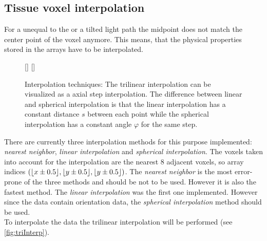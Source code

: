 \subsection{Tissue voxel interpolation}
% 
For a \stepsize{} unequal to the \voxelsize{} or a tilted light path the midpoint does not match the center point of the voxel anymore.
This means, that the physical properties stored in the arrays have to be interpolated.
% 
\begin{figure}[!t]
\centering
\setlength{\tikzwidth}{0.45\textwidth}
[\tikzwidth]{
\hfill{}\hfill}\hfill
{}[\tikzwidth]{
}
\caption[]{Interpolation techniques: The trilinear interpolation can be visualized as a axial step interpolation. The difference between linear and spherical interpolation is that the linear interpolation has a constant distance $s$ between each point while the spherical interpolation has a constant angle $\varphi$ for the same step.}
\label{fig:vectorfield_disc}
\end{figure}
% 
There are currently three interpolation methods for this purpose implemented: \textit{nearest neighbor}, \textit{linear interpolation} and \textit{spherical interpolation}. 
The voxels taken into account for the interpolation are the nearest 8 adjacent voxels, so array indices $(\lfloor x\pm0.5\rfloor,\lfloor y\pm0.5\rfloor,\lfloor y\pm0.5\rfloor)$.
% 
The \textit{nearest neighbor} is the most error-prone of the three methods and should be not to be used. 
However it is also the fastest method.
The \textit{linear interpolation} was the first one implemented.
However since the data contain orientation data, the \textit{spherical interpolation} method should be used.
\\
% 
To interpolate the data the trilinear interpolation will be performed (see \cref{fig:triInterp}).
% 
% 
% 
